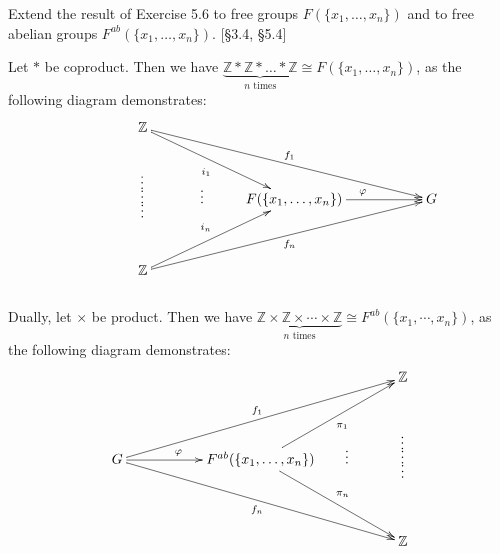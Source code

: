 \documentclass[12pt,letterpaper,boxed]{hmcpset}
\begin{document}
\begin{problem}[5.7]
Extend the result of Exercise 5.6 to free groups $F(\{x_1,\dots, x_n\})$ and to free
abelian groups $F^{ab}(\{x_1,\dots, x_n\})$. [§3.4, §5.4]	
\end{problem}
\begin{solution}

Let $*$ be coproduct. Then we have $\underbrace{\mathbb{Z}*\mathbb{Z}*\dots*\mathbb{Z}}_{n\text{ times}}\cong F(\{x_1,\dots, x_n\})$, as the following diagram demonstrates:
\[\xymatrix{
		\mathbb{Z}\ar[rrrd]^{f_1}\ar[rd]_{\hspace{-5ex}{i_1}} \\
		\hspace{4.2em}
		\raisebox{2.35ex}{\vdots}
		\raisebox{0ex}{\hspace{-0.63ex}\vdots}
		\raisebox{-2.35ex}{\hspace{-0.63ex}\vdots}
		\hspace{4em}
		\vdots 
		& F(\{x_1,\dots, x_n\})\ar[rr]^{\varphi} 
		& &G\\
		\mathbb{Z}\ar[rrru]_{f_n}\ar[ru]^{\hspace{-5ex}i_n}  
}\]
~\\
Dually, let $\times$ be product. Then we have $\underbrace{\mathbb{Z}\times\mathbb{Z}\times\cdots\times\mathbb{Z}}_{n\text{ times}}\cong F^{ab}(\{x_1,\cdots, x_n\})$, as the following diagram demonstrates:	
\[\xymatrix@R=12.7pt{
	 	 & & &&\mathbb{Z} \\
	 	 & & &&\\
		G\ar[rrrruu]^{f_1}\ar[rrrrdd]_{f_n}\ar[rr]^{\hspace{-1.5em}\varphi} & &F^{ab}(\{x_1,\dots,x_n\})\ar[rruu]_{\hspace{1ex}\pi_1}\ar[rrdd]^{\hspace{1ex}\pi_n}&
		&\hspace{-4.04em}
		\vdots
		\hspace{3.7em}
		\raisebox{2.35ex}{\vdots}
		\raisebox{0ex}{\hspace{-0.63ex}\vdots}
		\raisebox{-2.35ex}{\hspace{-0.63ex}\vdots}\\
		 & & &&\\
		 & & &&\mathbb{Z} 
}\]

\end{solution}
\end{document}
